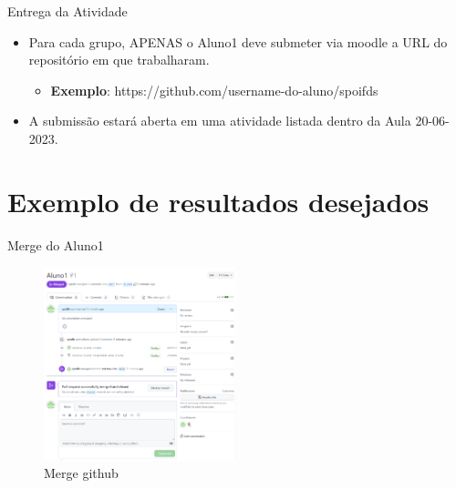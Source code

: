 \documentclass{beamer}
\begin{document}
\begin{frame}{Entrega da Atividade}
     \begin{itemize}
      \item  Para cada grupo, \textcolor{sintefred}{APENAS} o Aluno1 deve submeter via moodle a URL do repositório em que trabalharam.
      \begin{itemize}
            \item \textbf{Exemplo}: https://github.com/username-do-aluno/spoifds
      \end{itemize}
      \item A submissão estará aberta em uma atividade listada dentro da Aula 20-06-2023.
     \end{itemize}
\end{frame}



\section{Exemplo de resultados desejados}

\begin{frame}[fragile]{Merge do Aluno1}
      \begin{figure}[H]
            \centerline{\includegraphics[width=0.5\textwidth]{assets/aula-tdsi-ifds-2023-06-20/Captura de tela 2023-06-19 024507.png}}
            \caption{Merge github}
        \end{figure}
\end{frame}
\end{document}
